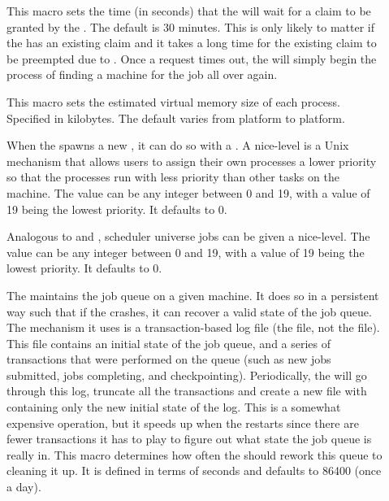 \begin{description}
\item[]
  \label{param:RequestClaimTimeout} This macro sets the time (in
  seconds) that the  will wait for a claim to be granted by the
  .  The default is 30 minutes.  This is only likely to matter
  if the  has an existing claim and it takes a long time for the
  existing claim to be preempted due to .
  Once a request times out, the  will simply begin the process
  of finding a machine for the job all over again.

\item[] \label{param:ShadowSizeEstimate}
  This macro sets the estimated virtual memory size of each
   process.  Specified in kilobytes.  The default
  varies from platform to platform.

\item[]
  \label{param:ShadowReniceIncrement} When the  spawns a new
  , it can do so with a .  A
  nice-level is a Unix mechanism that allows users to assign their own
  processes a lower priority so that the processes run with less
  priority than other tasks on the machine.  The value can be any
  integer between 0 and 19, with a value of 19 being the lowest
  priority.  It defaults to 0.

\item[]
  \label{param:SchedUnivReniceIncrement} Analogous to 
   and
  , scheduler universe jobs can be
  given a nice-level.  The value can be any integer between 0 and 19,
  with a value of 19 being the lowest priority.  It defaults to 0.

\item[] \label{param:QueueCleanInterval}
  The  maintains the job queue on a given machine.  It does so
  in a persistent way such that if the  crashes, it can recover
  a valid state of the job queue.  The mechanism it uses is a
  transaction-based log file (the  file,
  not the  file).  This file contains an initial
  state of the job queue, and a series of transactions that were
  performed on the queue (such as new jobs submitted, jobs completing,
  and checkpointing).  Periodically, the  will go through
  this log, truncate all the transactions and create a new file with
  containing only the new initial state of the log.
  This is a somewhat expensive operation,
  but it speeds up when the  restarts since there are
  fewer transactions it has to play to figure out what state the job
  queue is really in.  This macro determines how often the 
  should rework this queue to cleaning it up.  It is defined in terms of
  seconds and defaults to 86400 (once a day). 
  

\end{description}
